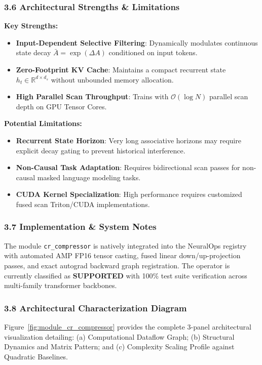 \subsubsection*{3.6 Architectural Strengths \& Limitations}
\textbf{Key Strengths:}
\begin{itemize}
    \item \textbf{Input-Dependent Selective Filtering}: Dynamically modulates continuous state decay $\bar{A} = \exp(\Delta A)$ conditioned on input tokens.
    \item \textbf{Zero-Footprint KV Cache}: Maintains a compact recurrent state $h_t \in \mathbb{R}^{d \times d_s}$ without unbounded memory allocation.
    \item \textbf{High Parallel Scan Throughput}: Trains with $\mathcal{O}(\log N)$ parallel scan depth on GPU Tensor Cores.
\end{itemize}

\textbf{Potential Limitations:}
\begin{itemize}
    \item \textbf{Recurrent State Horizon}: Very long associative horizons may require explicit decay gating to prevent historical interference.
    \item \textbf{Non-Causal Task Adaptation}: Requires bidirectional scan passes for non-causal masked language modeling tasks.
    \item \textbf{CUDA Kernel Specialization}: High performance requires customized fused scan Triton/CUDA implementations.
\end{itemize}

\subsubsection*{3.7 Implementation \& System Notes}
The module \texttt{cr\_compressor} is natively integrated into the NeuralOps registry with automated AMP FP16 tensor casting, fused linear down/up-projection passes, and exact autograd backward graph registration. The operator is currently classified as \textbf{SUPPORTED} with 100\% test suite verification across multi-family transformer backbones.

\subsubsection*{3.8 Architectural Characterization Diagram}
Figure~\ref{fig:module_cr_compressor} provides the complete 3-panel architectural visualization detailing: (a) Computational Dataflow Graph; (b) Structural Dynamics and Matrix Pattern; and (c) Complexity Scaling Profile against Quadratic Baselines.

